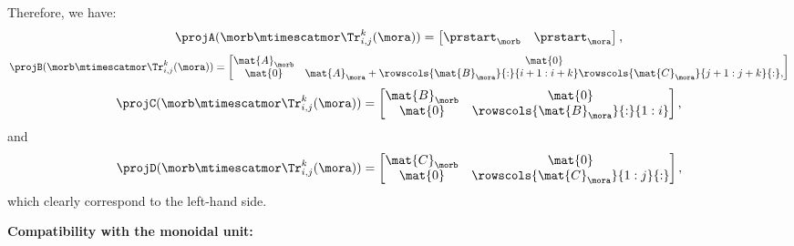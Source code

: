 \begin{example}
    Therefore, we have:
    \begin{equation*}
        \projA(\morb \mtimescatmor \Tr_{i,j}^k(\mora))=\begin{bmatrix}\prstart_\morb &\prstart_\mora\end{bmatrix},
    \end{equation*}
    \begin{equation*}
        \projB(\morb \mtimescatmor \Tr_{i,j}^k(\mora))=\begin{bmatrix}
            \mat{A}_\morb & \mat{0}                                                                                    \\
            \mat{0}       & \mat{A}_\mora + \rowscols{\mat{B}_\mora}{:}{i+1:i+k} \rowscols{\mat{C}_\mora}{j+1:j+k}{:},
        \end{bmatrix}
    \end{equation*}
    \begin{equation*}
        \projC(\morb \mtimescatmor \Tr_{i,j}^k(\mora))=\begin{bmatrix}
            \mat{B}_\morb & \mat{0}                          \\
            \mat{0}       & \rowscols{\mat{B}_\mora}{:}{1:i}
        \end{bmatrix},
    \end{equation*}
    and
    \begin{equation*}
        \projD(\morb \mtimescatmor \Tr_{i,j}^k(\mora))=
        \begin{bmatrix}
            \mat{C}_\morb & \mat{0}                          \\
            \mat{0}       & \rowscols{\mat{C}_\mora}{1:j}{:}
        \end{bmatrix},
    \end{equation*}
    which clearly correspond to the left-hand side.

    \textbf{Compatibility with the monoidal unit:}


\end{example}
